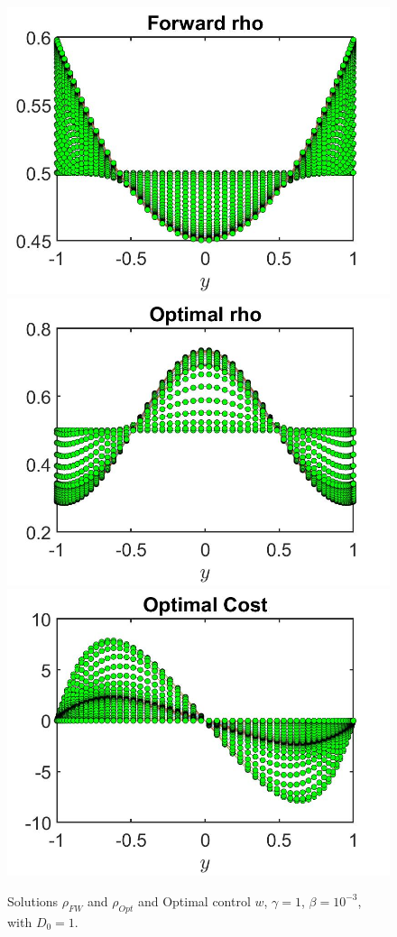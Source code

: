 \documentclass[11pt, a4paper]{article}
\theoremstyle{definition}
\begin{document}
\begin{figure}[h]
	\includegraphics[scale=0.3]{rhoFWD03.jpg}	\includegraphics[scale=0.3]{rhoOptD03.jpg}
	\includegraphics[scale=0.3]{wOptD03.jpg}
	\caption{Solutions $\rho_{FW}$ and $\rho_{Opt}$ and Optimal control $w$, $\gamma = 1$, $\beta = 10^{-3}$, with $D_0 = 1$.}
	\label{rhoD03}
\end{figure}
\end{document}
